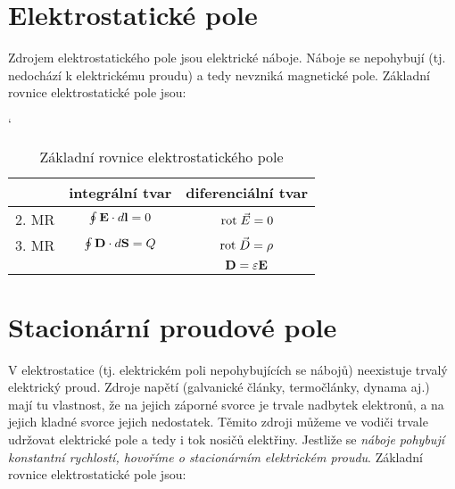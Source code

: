   \section{Elektrostatické pole}
    Zdrojem elektrostatického pole jsou elektrické náboje. Náboje se nepohybují (tj. nedochází k
    elektrickému proudu) a tedy nevzniká magnetické pole. Základní rovnice elektrostatické pole
    jsou:
    \begin{table}[h]
      \centering
      \catcode`
      \begin{tabular}{l c|c|}
        \cline{2-3}
        \multicolumn{1}{l|}{} & \textbf{integrální tvar} & \textbf{diferenciální tvar}  \\
        \hline
        \multicolumn{1}{|l|}{2. MR} & $\oint\mathbf{E}\cdot d\mathbf{l} = 0$ & $\mathrm{rot}\;\vec{E} = 0$    \\ 
        \cline{1-3}
        \hline
        \multicolumn{1}{|l|}{3. MR} & $\oint\mathbf{D}\cdot d\mathbf{S} = Q$ & $\mathrm{rot}\;\vec{D} = \rho$ \\
        \cline{1-3}
        & & $\mathbf{D} = \varepsilon\mathbf{E}$ \\
        \cline{3-3}
      \end{tabular}
      \caption{Základní rovnice elektrostatického pole}
   \end{table}

  \newpage
  \section{Stacionární proudové pole}
    V elektrostatice (tj. elektrickém poli nepohybujících se nábojů) neexistuje trvalý elektrický
    proud. Zdroje napětí (galvanické články, termočlánky, dynama aj.) mají tu vlastnost, že na
    jejich záporné svorce je trvale nadbytek elektronů, a na jejich kladné svorce jejich
    nedostatek. Těmito zdroji můžeme ve vodiči trvale udržovat elektrické pole a tedy i tok nosičů
    elektřiny. Jestliže se \emph{náboje pohybují konstantní rychlostí, hovoříme o stacionárním
    elektrickém proudu}. Základní rovnice elektrostatické pole jsou:

